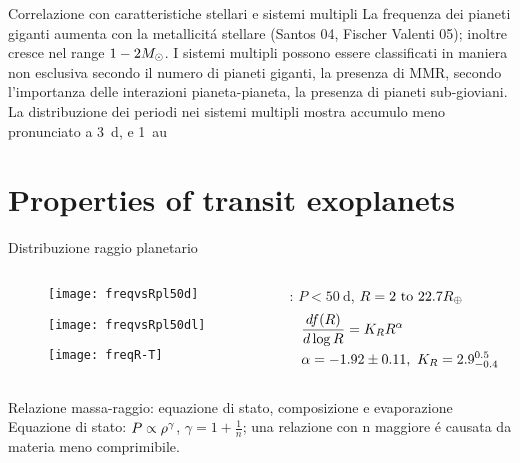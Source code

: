 \begin{wordonframe}{Correlazione con caratteristiche stellari e sistemi multipli}
La frequenza dei pianeti giganti aumenta con la metallicit\'a stellare (Santos 04, Fischer Valenti 05); inoltre cresce nel range $1-2\msun{}$.
I sistemi multipli possono essere classificati in maniera non esclusiva secondo il numero di pianeti giganti, la presenza di MMR, secondo l'importanza delle interazioni pianeta-pianeta, la presenza di pianeti sub-gioviani.
La distribuzione dei periodi nei sistemi multipli mostra accumulo meno pronunciato a \SI{3}{\day}, e \SI{1}{\astronomicalunit}
\end{wordonframe}


\section{Properties of transit exoplanets}

\begin{frame}{Distribuzione raggio planetario}
\begin{columns}[T] \begin{column}{0.5\textwidth}
\begin{figure}[!ht]
\centering \texttt{[image: freqvsRpl50d]}\label{fig:freqvsRpl50d}\end{figure}%
\begin{figure}[!ht]\centering \texttt{[image: freqvsRpl50dl]} \label{fig:freqvsRpl50dl}
\end{figure}%
\begin{figure}[!ht]\centering \texttt{[image: freqR-T]} \label{fig:freqR-T}
\end{figure}%
\end{column} \begin{column}{0.5\textwidth}
\cite{howard2012planet}: $P<\SI{50}{\day}$, $R=\numrange{2}{22.7}\rearth{}$
\begin{align*}
&\TDy{\log{R}}{f(R)}=K_RR\expy{\alpha}\\
&\alpha=-1.92\pm0.11,\ K_R=2.9_{-0.4}^{0.5}
\end{align*}
\end{column}  \end{columns}
\end{frame}

\begin{wordonframe}{Relazione massa-raggio: equazione di stato, composizione e evaporazione}
Equazione di stato: $P\propto\rho\expy{\gamma}$, $\gamma=1+\frac{1}{n}$; una relazione con n maggiore \'e causata da materia meno comprimibile.
\end{wordonframe}

